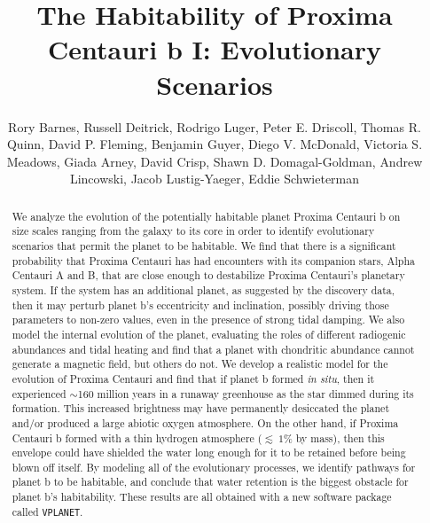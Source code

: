 \documentclass[preprint,12pt]{aastex}
\def\vplanet{\texttt{\footnotesize{VPLANET}}\xspace}
\begin{document}
\title{The Habitability of Proxima Centauri b I: Evolutionary Scenarios}
\author{Rory Barnes, Russell Deitrick, Rodrigo Luger, Peter E. Driscoll, Thomas R. Quinn, David P. Fleming, Benjamin Guyer, Diego V. McDonald, Victoria S. Meadows, Giada Arney, David Crisp, Shawn D. Domagal-Goldman, Andrew Lincowski, Jacob Lustig-Yaeger, Eddie Schwieterman}

\begin{abstract}
We analyze the evolution of the potentially habitable planet Proxima
Centauri b on size scales ranging from the galaxy to its core in order
to identify evolutionary scenarios that permit the planet to be
habitable. We find that there is a significant probability that
Proxima Centauri has had encounters with its companion stars, Alpha
Centauri A and B, that are close enough to destabilize Proxima
Centauri's planetary system. If the system has an additional
planet, as suggested by the discovery data, then it may perturb
planet b's eccentricity and inclination, possibly driving those
parameters to non-zero values, even in the presence of strong tidal
damping. We also model the internal evolution of the planet, evaluating
the roles of different radiogenic abundances and tidal heating and
find that a planet with chondritic abundance cannot generate a magnetic field, but
others do not. We develop a realistic model for the evolution of
Proxima Centauri and find that if planet b formed {\it in situ}, then it
experienced $\sim$160 million years in a runaway greenhouse as the star
dimmed during its formation. This increased brightness may have permanently
desiccated the planet and/or produced a large abiotic
oxygen atmosphere. On the other hand, if Proxima Centauri b formed
with a thin hydrogen atmosphere ($\lesssim~1$\% by mass), then this envelope could have shielded
the water long enough for it to be retained before being
blown off itself. By modeling all of the evolutionary processes, we identify pathways for planet b to be
habitable, and conclude that water retention is the biggest obstacle
for planet b's habitability. These results are all obtained with a new
software package called \vplanet.

\end{abstract}
\end{document}
